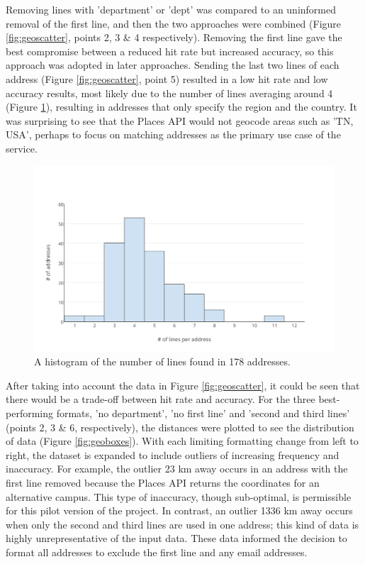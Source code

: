 \documentclass[Report.tex]{subfiles}
\begin{document}
\noindent Removing lines with 'department' or 'dept' was compared to an uninformed removal of the first line, and then the two approaches were combined (Figure \ref{fig:geoscatter}, points 2, 3 \& 4 respectively). Removing the first line gave the best compromise between a reduced hit rate but increased accuracy, so this approach was adopted in later approaches. Sending the last two lines of each address (Figure \ref{fig:geoscatter}, point 5) resulted in a low hit rate and low accuracy results, most likely due to the number of lines averaging around 4 (Figure \ref{fig:addresslines}), resulting in addresses that only specify the region and the country. It was surprising to see that the Places API would not geocode areas such as 'TN, USA', perhaps to focus on matching addresses as the primary use case of the service.\newline

\begin{figure}[h!]
	\includegraphics[width=\textwidth]{../lib/images/address-lines-histogram}
	\caption{A histogram of the number of lines found in 178 addresses.\label{fig:addresslines}}
\end{figure}

\noindent After taking into account the data in Figure \ref{fig:geoscatter}, it could be seen that there would be a trade-off between hit rate and accuracy. For the three best-performing formats, 'no department', 'no first line' and 'second and third lines' (points 2, 3 \& 6, respectively), the distances were plotted to see the distribution of data (Figure \ref{fig:geoboxes}). With each limiting formatting change from left to right, the dataset is expanded to include outliers of increasing frequency and inaccuracy. For example, the outlier 23 km away occurs in an address with the first line removed because the Places API returns the coordinates for an alternative campus. This type of inaccuracy, though sub-optimal, is permissible for this pilot version of the project. In contrast, an outlier 1336 km away occurs when only the second and third lines are used in one address; this kind of data is highly unrepresentative of the input data. These data informed the decision to format all addresses to exclude the first line and any email addresses.
\end{document}
